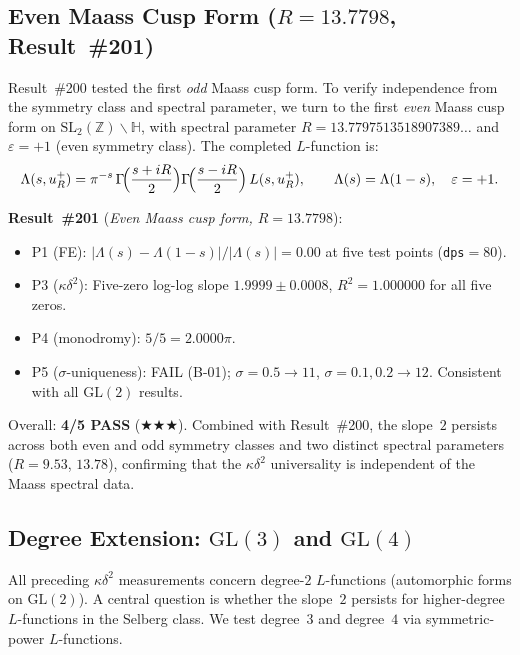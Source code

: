 \documentclass[11pt, a4paper]{article}
\theoremstyle{plain}
\theoremstyle{definition}
\begin{document}
\subsection{Even Maass Cusp Form ($R=13.7798$, Result~\#201)}
\label{ssec:maass_even}

Result~\#200 tested the first \emph{odd} Maass cusp form.  To verify
independence from the symmetry class and spectral parameter, we turn to
the first \emph{even} Maass cusp form on
$\mathrm{SL}_2(\mathbb{Z})\backslash\mathbb{H}$, with spectral parameter
$R=13.7797513518907389\ldots$ and $\varepsilon=+1$ (even symmetry class).
The completed $L$-function is:
\[
  \Lambda(s,u_R^{+}) = \pi^{-s}\,
  \Gamma\!\Bigl(\frac{s+iR}{2}\Bigr)
  \Gamma\!\Bigl(\frac{s-iR}{2}\Bigr)\,L(s,u_R^{+}), \qquad
  \Lambda(s)=\Lambda(1-s), \quad \varepsilon=+1.
\]

\medskip
\noindent\textbf{Result~\#201} (\textit{Even Maass cusp form, $R=13.7798$}):
\begin{itemize}
  \item P1 (FE): $|\Lambda(s)-\Lambda(1-s)|/|\Lambda(s)|=0.00$ at five test
        points (\texttt{dps}$=80$).
  \item P3 ($\kappa\delta^{2}$): Five-zero log-log slope
        $\mathbf{1.9999\pm 0.0008}$, $R^{2}=1.000000$ for all five zeros.
  \item P4 (monodromy): $5/5=2.0000\pi$.
  \item P5 ($\sigma$-uniqueness): FAIL (B-01); $\sigma=0.5\to 11$,
        $\sigma=0.1,0.2\to 12$.  Consistent with all $\mathrm{GL}(2)$ results.
\end{itemize}
Overall: \textbf{4/5 PASS} ($\bigstar\bigstar\bigstar$).
Combined with Result~\#200, the slope~$2$ persists across both even and
odd symmetry classes and two distinct spectral parameters ($R=9.53$,
$13.78$), confirming that the $\kappa\delta^{2}$ universality is
independent of the Maass spectral data.


\subsection{Degree Extension: $\mathrm{GL}(3)$ and $\mathrm{GL}(4)$}
\label{ssec:degree_ext}

All preceding $\kappa\delta^{2}$ measurements concern degree-$2$
$L$-functions (automorphic forms on $\mathrm{GL}(2)$).  A central
question is whether the slope~$2$ persists for higher-degree
$L$-functions in the Selberg class.  We test degree~$3$ and degree~$4$
via symmetric-power $L$-functions.
\end{document}
